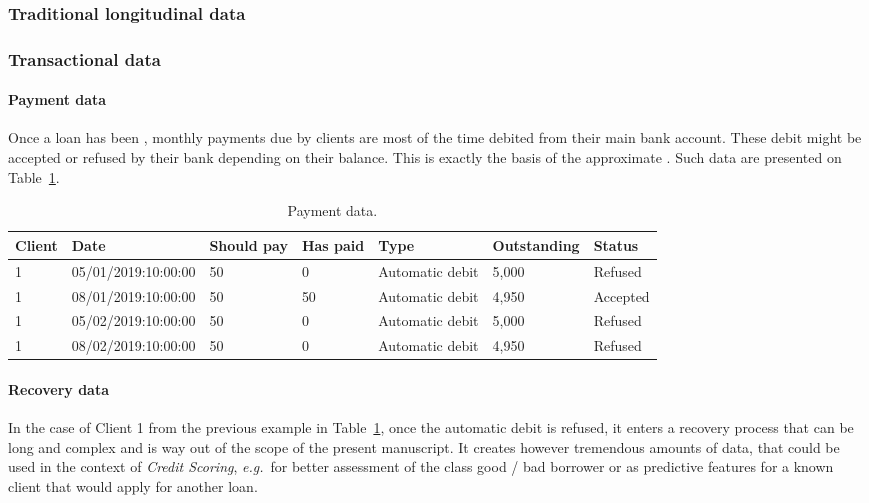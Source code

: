 \subsubsection{Traditional longitudinal data}


\subsubsection{Transactional data}

\paragraph{Payment data}

Once a loan has been , monthly payments due by clients are most of the time debited from their main bank account. These debit might be accepted or refused by their bank depending on their balance. This is exactly the basis of the approximate . Such data are presented on Table~\ref{tab:payment_data}.

\begin{table}[ht]
    \centering
    \caption{Payment data.}
    \label{tab:payment_data}
    \begin{small}
\begin{tabular}{lllllll}
Client & Date & Should pay & Has paid & Type & Outstanding & Status \\
 \hline
1 & 05/01/2019:10:00:00 & 50 & 0 & Automatic debit & 5{,}000 & Refused \\
1 & 08/01/2019:10:00:00 & 50 & 50 & Automatic debit & 4{,}950 & Accepted \\
1 & 05/02/2019:10:00:00 & 50 & 0 & Automatic debit & 5{,}000 & Refused \\
1 & 08/02/2019:10:00:00 & 50 & 0 & Automatic debit & 4{,}950 & Refused
\end{tabular}
    \end{small}
\end{table}


\paragraph{Recovery data}

In the case of Client 1 from the previous example in Table~\ref{tab:payment_data}, once the automatic debit is refused, it enters a recovery process that can be long and complex and is way out of the scope of the present manuscript. It creates however tremendous amounts of data, that could be used in the context of \textit{Credit Scoring}, \textit{e.g.}\ for better assessment of the class good / bad borrower or as predictive features for a known client that would apply for another loan.

